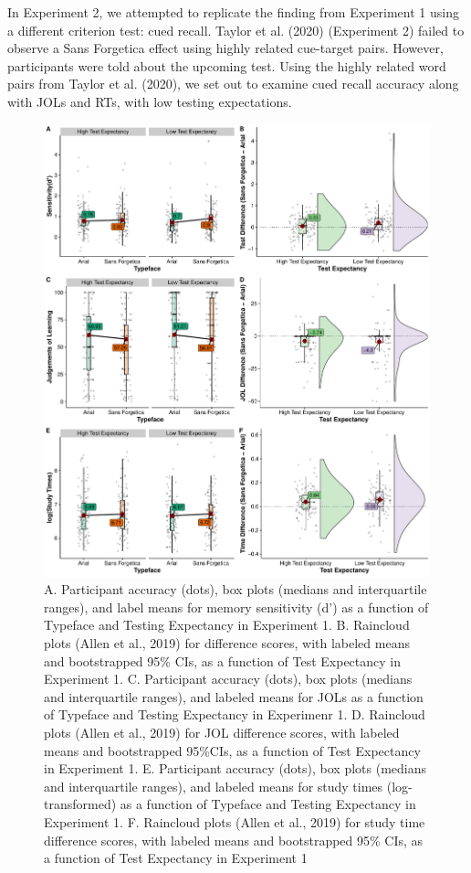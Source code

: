 \documentclass[
  english,
  jou]{apa7}
\begin{document}
In Experiment 2, we attempted to replicate the finding from Experiment 1 using a different criterion test: cued recall. Taylor et al. (2020) (Experiment 2) failed to observe a Sans Forgetica effect using highly related cue-target pairs. However, participants were told about the upcoming test. Using the highly related word pairs from Taylor et al. (2020), we set out to examine cued recall accuracy along with JOLs and RTs, with low testing expectations.

\begin{figure}

{\centering \includegraphics{Testing_Expectancy_SF_RR_files/figure-latex/unnamed-chunk-19-1} 

}

\caption{A. Participant accuracy (dots), box plots (medians and interquartile ranges), and label means for memory sensitivity (d') as a function of Typeface and Testing Expectancy in Experiment 1. B. Raincloud plots (Allen et al., 2019) for difference scores, with labeled means and bootstrapped 95\% CIs, as a function of Test Expectancy in Experiment 1. C. Participant accuracy (dots), box plots (medians and interquartile ranges), and labeled means for JOLs as a function of Typeface and Testing Expectancy in Experimenr 1. D. Raincloud plots (Allen et al., 2019) for JOL difference scores, with labeled means and bootstrapped 95\%CIs, as a function of Test Expectancy in Experiment 1. E. Participant accuracy (dots), box plots (medians and interquartile ranges), and labeled means for study times (log-transformed) as a function of Typeface and Testing Expectancy in Experiment 1. F. Raincloud plots (Allen et al., 2019) for study time difference scores, with labeled means and bootstrapped 95\% CIs, as a function of Test Expectancy in Experiment 1}\label{fig:unnamed-chunk-19}
\end{figure}
\end{document}
